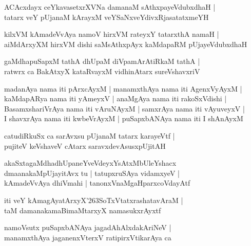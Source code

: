 \documentclass[twoside,12pt,openright]{book}
\def\S{\char'263}
\newcounter{shloka}[chapter]
\begin{document}
\begin{shloka}%
ACAcxdayx ceYkavasetxrXVNa damanaM sAthxpayeVdubxdhaH |\\
tatarx veY pUjanaM kArayxM veYSaNxveYdivxRjasatatxmeYH
\end{shloka}

\begin{shloka}%
kilxVM kAmadeVvAya namoV hirxVM rateyxY tatarxthA namaH |\\
aiMdArxyXM hirxVM dishi saMsAthxpAyx kaMdapaRM pUjayeVdubxdhaH
\end{shloka}

\begin{shloka}%
gaMdhapuSapxM tathA dhUpaM diVpamArAtiRkaM tathA |\\
ratwrx ca BakAtxyX kataRvayxM vidhinAtarx sureVshavxriV
\end{shloka}

\begin{shloka}%
madanAya nama iti pArxcAyxM | manamxthAya nama iti AgenxVyAyxM |\\
kaMdapARya nama iti yAmeyxV | anaMgAya nama iti rakoSxVdishi |\\
BasamxshariVrAya nama iti vAruNAyxM | samxrAya nama iti vAyuveyxV |\\
I shavxrAya nama iti kwbeVrAyxM | puSapxbANAya nama iti I shAnAyxM
\end{shloka}

\begin{shloka}%
catudiRkuSx ca sarAvxsu pUjanaM tatarx karayeVtf |\\
pujiteV keVshaveV cAtarx saravxdevAsusxpUjitAH 
\end{shloka}

\begin{shloka}%
akaSxtagaMdhadhUpaneYveVdeyxYsAtxMbUleYshacx \\
dmaanakaMpUjayitAvx tu | tatupxruSAya vidamxyeV |\\
kAmadeVvAya dhiVmahi | tanonxVnaMgaHparxcoVdayAtf 
\end{shloka}

\begin{shloka}%
iti veY kAmagAyatArxyX\S SoTxVtatxrashatavAraM |\\
taM damanakamaBimaMtarxyX namasukxrAyxtf 
\end{shloka}

\begin{shloka}%
namoVsutx puSapxbANAya jagadAhAlxdakAriNeV |\\
manamxthAya jaganenxVterxV ratipirxVtikarAya ca 
\end{shloka}
\end{document}
